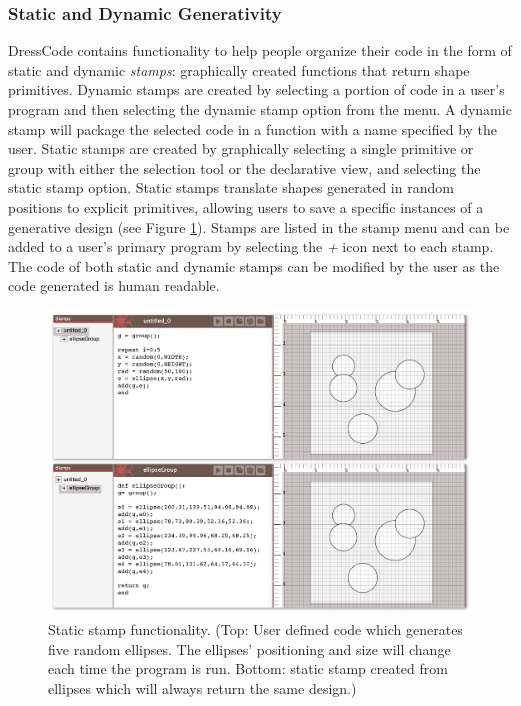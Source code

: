 \documentclass{sigchi}
\begin{document}
\subsubsection{Static and Dynamic Generativity}
DressCode contains functionality to help people organize their code in the form of static and dynamic \textit{stamps}: graphically created functions that return shape primitives. Dynamic stamps are created by selecting a portion of code in a user's program and then selecting the dynamic stamp option from the menu. A dynamic stamp will package the selected code in a function with a name specified by the user. Static stamps are created by graphically selecting a single primitive or group with either the selection tool or the declarative view, and selecting the static stamp option. Static stamps translate shapes generated in random positions to explicit primitives, allowing users to save a specific instances of a generative design (see Figure \ref{fig:stamps}).
Stamps are listed in the stamp menu and can be added to a user's primary program by selecting the \textit{+} icon next to each stamp. The code of both static and dynamic stamps can be modified by the user as the code generated is human readable.

\begin{center}
\begin{figure}[h!]
\includegraphics[width=\columnwidth]{images/stamps.jpg}
\caption{Static stamp functionality. (Top: User defined code which generates five random ellipses. The ellipses' positioning and size will change each time the program is run. Bottom: static stamp created from ellipses which will always return the same design.)}
\label{fig:stamps}
\end{figure}
\end{center}
\vspace{-20pt}
\end{document}

